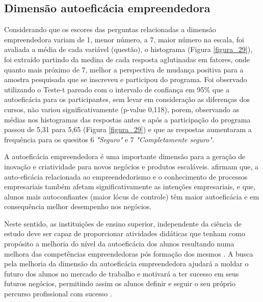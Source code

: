 

\subsection{Dimensão autoeficácia empreendedora}

Considerando que os escores das perguntas relacionadas a dimensão empreendedora variam de 1, menor número, a 7, maior número na escala, foi avaliada a média de cada variável (questão),
o histograma (Figura \ref{figura_29}), foi extraído partindo da medina de cada resposta aglutinadas em fatores, onde quanto mais próximo de 7, melhor a perspectiva de mudança positiva para a amostra pesquisada que se inscreveu e participou do programa. Foi observado utilizando o Teste-t pareado com o intervalo de confiança em 95\%  que a autoeficácia para os participantes, sem levar em consideração as diferenças dos cursos, não variou significativamente (p-value 0,118), porem, observando as médias nos histogramas das respostas antes e após a participação do programa passou de 5,31 para 5,65 (Figura \ref{figura_29}) e que as respostas aumentaram a frequência para os quesitos 6 \textit{"Seguro"} e 7 \textit{"Completamente seguro"}.

A autoeficácia empreendedora é uma importante dimensão para a geração de inovação e criatividade para novos negócios e produtos escaláveis.  afirmam que, a auto-eficácia relacionada ao empreendedorismo e o conhecimento de processos empresariais também afetam significativamente as intenções empresariais, e que, alunos mais autoconfiantes (maior lócus de controle) têm maior autoeficácia e em consequência melhor desempenho nos negócios.


Neste sentido, as instituições de ensino superior, independente da ciência de estudo deve ser capaz de proporcionar atividades didáticas que tenham como propósito a melhoria do nível da autoeficácia dos alunos resultando numa melhora das competências empreendedoras  pós formação dos mesmos \cite{ribeiro_autoeficacia_2019}. A busca pela melhoria da dimensão da autoeficácia empreendedora ajudará a moldar o futuro dos alunos no mercado de trabalho e motivará a ter sucesso em seus futuros negócios, permitindo assim os alunos  definir e seguir o seu próprio percurso profissional com sucesso  \cite{das_examining_2018}.

